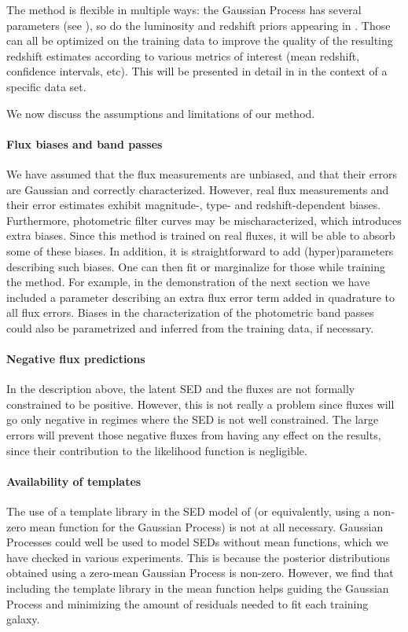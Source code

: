 \documentclass[aps,prd,showpacs,superscriptaddress,groupedaddress]{revtex4}  %
\begin{document}
The method is flexible in multiple ways: the Gaussian Process has several parameters (see ), so do the luminosity and redshift priors appearing in .
Those can all be optimized on the training data to improve the quality of the resulting redshift estimates according to various metrics of interest (\eg mean redshift, confidence intervals, etc).
This will be presented in detail in  in the context of a specific data set.

\smallskip
We now discuss the assumptions and limitations of our method.
\smallskip

\paragraph{Flux biases and band passes} 
We have assumed that the flux measurements are unbiased, and that their errors are Gaussian and correctly characterized.
However, real flux measurements and their error estimates exhibit magnitude-, type- and redshift-dependent biases.
Furthermore, photometric filter curves may be mischaracterized, which introduces extra biases.
Since this method is trained on real fluxes, it will be able to absorb some of these biases. 
In addition, it is straightforward to add (hyper)parameters describing such biases.
One can then fit or marginalize for those while training the method.
For example, in the demonstration of the next section we have included a parameter describing an extra flux error term added in quadrature to all flux errors.
Biases in the characterization of the photometric band passes could also be parametrized and inferred from the training data, if necessary.

\paragraph{Negative flux predictions}
In the description above, the latent SED and the fluxes are not formally constrained to be positive. 
However, this is not really a problem since fluxes will go only negative in regimes where the SED is not well constrained.
The large errors will prevent those negative fluxes from having any effect on the results, since their contribution to the likelihood function is negligible.

\paragraph{Availability of templates} 
The use of a template library in the SED model of  (or equivalently, using a non-zero mean function for the Gaussian Process) is not at all necessary.
Gaussian Processes could well be used to model SEDs without mean functions, which we have checked in various experiments.
This is because the posterior distributions obtained using a zero-mean Gaussian Process is non-zero.
However, we find that including the template library in the mean function helps guiding the Gaussian Process and minimizing the amount of residuals needed to fit each training galaxy.
\end{document}

